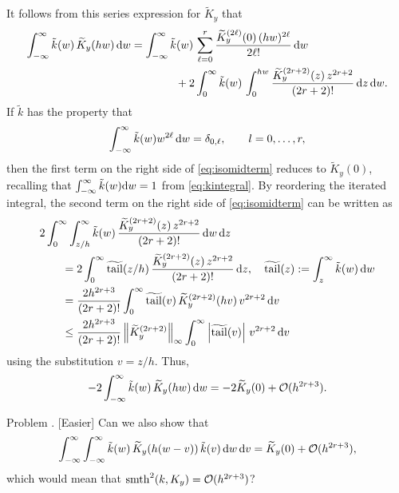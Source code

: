 \documentclass[letterpaper]{amsart}
\newcommand{\KY}{K_y}
\newcommand{\tKY}{\widetilde{K}_y}
\newcommand{\tk}{\tilde{k}}
\DeclareMathOperator{\ttk}{\widetilde{tail}}
\DeclareMathOperator{\smooth}{smth}
\newcounter{probcnt}
\newenvironment{Problem}{\bigskip \LARGE \color{red} \refstepcounter{probcnt} \noindent Problem \theprobcnt. }{\normalsize \color{black} \bigskip}
\begin{document}
It follows from this series expression for $\tKY$ that
\begin{align} \label{eq:isomidterm}
	\int_{-\infty}^{\infty} \tk(w) \, \tKY(hw) \, \dif w & =
	\int_{-\infty}^{\infty} \tk(w) \, \sum_{\ell = 0}^{r} \frac{\tKY^{(2\ell)}(0) \, (hw)^{2\ell}}{2\ell!}  \, \dif w \\
	&
	\nonumber
	\qquad \qquad
	+ 2 \int_{0}^{\infty} \tk(w) \,  \int_0^{hw} \frac{\tKY^{(2r+2)}(z) \,  z^{2r+2}}{(2r+2)!} \, \dif z  \, \dif w.
\end{align}
If $\tk$ has the property that
\begin{equation} \label{eq:tkprop}
	\int_{-\infty}^{\infty} \tk(w) w^{2\ell}  \, \dif w =  \delta_{0,\ell}, \qquad l=0,\dots,r,
\end{equation}
then the first term on the right side of \eqref{eq:isomidterm} reduces to $\tKY(0)$, recalling that $\int_{-\infty}^\infty \tilde{k}(w) {\rm d} w = 1$ from \eqref{eq:kintegral}.   By reordering the iterated integral, the  second term on the right side of  \eqref{eq:isomidterm} can be written as
\begin{align*}
	\MoveEqLeft{2 \int_{0}^{\infty}  \int_{z/h}^\infty \tk(w) \, \frac{\tKY^{(2r+2)}(z) \,  z^{2r+2}}{(2r+2)!}   \, \dif w \, \dif z} \\
	& =  2\int_{0}^{\infty}  \ttk(z/h) \, \frac{\tKY^{(2r+2)}(z) \,  z^{2r+2}}{(2r+2)!}    \, \dif z,
	\quad \ttk(z) := \int_{z}^\infty \tk(w) \, \dif w \\
	& =  \frac{2h^{2r+3}}{(2r+2)!} \int_{0}^{\infty}  \ttk(v) \, \tKY^{(2r+2)}(hv) \,  v^{2r+2}    \, \dif v \\
	&  \le  \frac{2h^{2r+3}}{(2r+2)!}  \norm[\infty]{\tKY^{(2r+2)}} \int_{0}^{\infty}  \abs{\ttk(v)}  \,  v^{2r+2}    \, \dif v \\
\end{align*}
using the substitution $v = z/h$.  Thus,
\[
- 2 \int_{-\infty}^{\infty} \tk(w) \, \tKY(hw) \, \dif w  = -2\tKY(0) + \Order(h^{2r+3}).
\]

\begin{Problem} [Easier]
    Can we also show that
    \[
    \int_{-\infty}^{\infty} \int_{-\infty}^{\infty}  \tk(w) \, \tKY(h(w-v)) \, \tk(v)\, \dif w \, \dif v = \tKY(0) + \Order(h^{2r+3}),
    \]
    which would mean that $\smooth^2(k,\KY) =\Order(h^{2r+3}) $?
\end{Problem}
\end{document}
